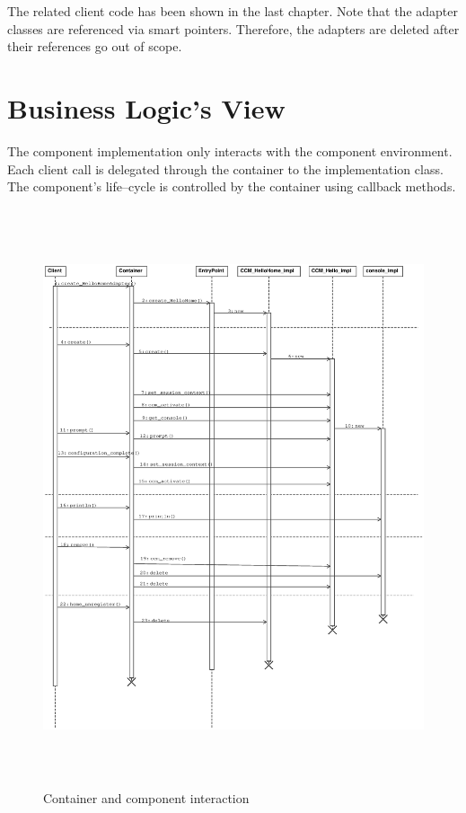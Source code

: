 \noindent
The related client code has been shown in the last chapter.
Note that the adapter classes are referenced via smart pointers. Therefore,
the adapters are deleted after their references go out of scope.


\section{Business Logic's View}

The component implementation only interacts with the component environment.
Each client call is delegated through the container to the implementation class.
The component's life--cycle is controlled by the container using callback methods.

\begin{figure}[htbp]
    \begin{center}
        \includegraphics [height=17cm,angle=0] {uml/BusinessLogicView.eps}
        \caption{Container and component interaction}
        \label{BusinessLogicView}
    \end{center}
\end{figure}


